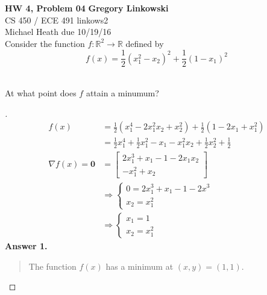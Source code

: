 \documentclass[12pt]{article}
\newenvironment{exercise}[2][Exercise]{\begin{trivlist}
\item[\hskip \labelsep {\bfseries #1}\hskip \labelsep {\bfseries #2.}]}{\end{trivlist}}
\begin{document}
\noindent
\large\textbf{HW 4, Problem 04} \hfill \textbf{Gregory Linkowski} \\
\normalsize CS 450 / ECE 491 \hfill linkows2 \\
Michael Heath \hfill due 10/19/16 \\


\vspace{5mm}
Consider the function $f : \mathbb{R}^2 \rightarrow \mathbb{R}$ defined by
\[ f(x) = \frac{1}{2}\left( x_1^2 - x_2 \right) ^2 + \frac{1}{2} \left( 1 - x_1 \right) ^2 \] 
\vspace{-2mm} \\

\begin{exercise}{1}
	At what point does $f$ attain a minumum?
\end{exercise} \vspace{-10mm}
\begin{proof}[]
	\begin{align*}
		f(x) &= \frac{1}{2}\left( x_1^4 - 2 x_1^2 x_2 + x_2^2 \right) + \frac{1}{2}\left( 1 - 2 x_1 + x_1^2 \right) \\
		 &= \frac{1}{2} x_1^4 + \frac{1}{2} x_1^2 - x_1 - x_1^2 x_2 + \frac{1}{2} x_2^2 + \frac{1}{2} \\[15pt]
		\nabla f(x) = \bm{0} &= \begin{bmatrix} 2x_1^3 + x_1 - 1 - 2 x_1 x_2 \\ -x_1^2 + x_2 \end{bmatrix} \\
		 &\Rightarrow \begin{cases} 0 = 2 x_1^3 + x_1 - 1 - 2 x^3 \\ x_2 = x_1^2 \end{cases} \\
		 &\Rightarrow \begin{cases} x_1 = 1 \\ x_2 = x_1^2 \end{cases}
	\end{align*}
	\textbf{Answer 1.} \vspace{-7mm} \\
	\begin{quote}
		The function $f(x)$ has a minimum at $(x,y) = (1,1)$.
	\end{quote}
\end{proof}
\end{document}
